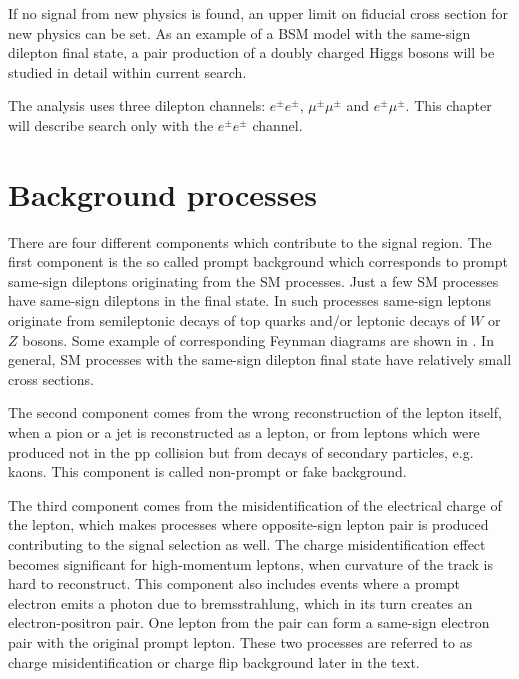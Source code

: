 If no signal from new physics is found, an upper limit on fiducial cross section for new physics can be set.
As an example of a BSM model with the same-sign dilepton final state, a pair production of a doubly charged Higgs bosons
will be studied in detail within current search.

The analysis uses three dilepton channels: $e^{\pm}e^{\pm}$, $\mu^{\pm}\mu^{\pm}$ and $e^{\pm}\mu^{\pm}$.
This chapter will describe search only with the $e^{\pm}e^{\pm}$ channel.

\section{Background processes}
\label{sec:wprimeBackgrounds}

There are four different components which contribute to the signal region.
The first component is the so called prompt background which corresponds to prompt same-sign dileptons originating from the SM processes.
Just a few SM processes have same-sign dileptons in the final state. In such processes same-sign leptons originate from semileptonic decays of top quarks
and/or leptonic decays of $W$ or $Z$ bosons. Some example of corresponding Feynman diagrams are shown in .
In general, SM processes with the same-sign dilepton final state have relatively small cross sections.

The second component comes from the wrong reconstruction of the lepton itself, when a pion or a jet is reconstructed as a lepton, or from leptons which were produced 
not in the pp collision but from decays of secondary particles, e.g. kaons. This component is called non-prompt or fake background.

The third component comes from the misidentification of the electrical charge of the lepton, which makes processes where opposite-sign lepton pair is produced 
contributing to the signal selection as well. The charge misidentification effect becomes significant for high-momentum leptons, when curvature of the track 
is hard to reconstruct. 
This component also includes events where a prompt electron emits a photon due to bremsstrahlung, which in its turn creates an electron-positron pair.
One lepton from the pair can form a same-sign electron pair with the original prompt lepton. These two processes are referred to as charge misidentification or
charge flip background later in the text.

